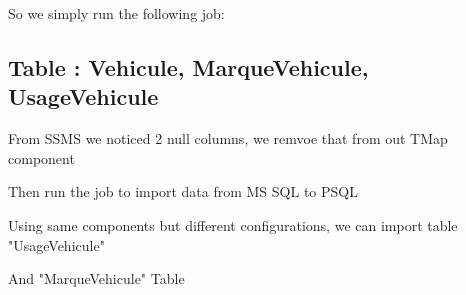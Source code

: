 So we simply run the following job:
\begin{figure}[H]
\centering
{}
\end{figure}

\subsection{Table : Vehicule, MarqueVehicule, UsageVehicule }

From SSMS we noticed 2 null columns, we remvoe that from out TMap component
\begin{figure}[H]
\centering
{}
\end{figure}

Then run the job to import data from MS SQL to PSQL
\begin{figure}[H]
\centering
{}
\end{figure}

Using same components but different configurations, we can import table "UsageVehicule"
\begin{figure}[H]
\centering
{}
\end{figure}

And "MarqueVehicule" Table
\begin{figure}[H]
\centering
{}
\end{figure}

